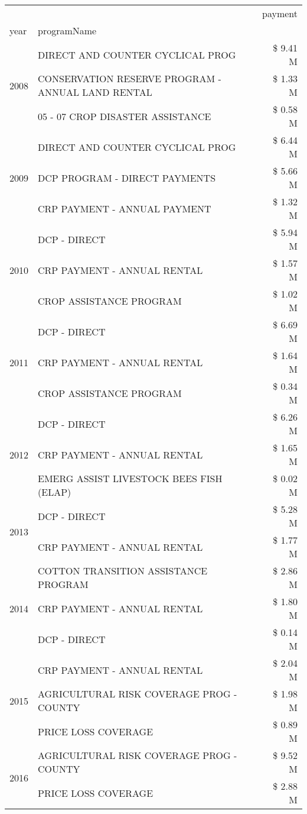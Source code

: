 \begin{tabular}{llr}
\toprule
 &  & payment \\
year & programName &  \\
\midrule
\multirow[t]{3}{*}{2008} & DIRECT AND COUNTER CYCLICAL PROG & \$ 9.41 M \\
 & CONSERVATION RESERVE PROGRAM - ANNUAL LAND RENTAL & \$ 1.33 M \\
 & 05 - 07 CROP DISASTER ASSISTANCE & \$ 0.58 M \\
\cline{1-3}
\multirow[t]{3}{*}{2009} & DIRECT AND COUNTER CYCLICAL PROG & \$ 6.44 M \\
 & DCP PROGRAM - DIRECT PAYMENTS & \$ 5.66 M \\
 & CRP PAYMENT - ANNUAL PAYMENT & \$ 1.32 M \\
\cline{1-3}
\multirow[t]{3}{*}{2010} & DCP - DIRECT & \$ 5.94 M \\
 & CRP PAYMENT - ANNUAL RENTAL & \$ 1.57 M \\
 & CROP ASSISTANCE PROGRAM & \$ 1.02 M \\
\cline{1-3}
\multirow[t]{3}{*}{2011} & DCP - DIRECT & \$ 6.69 M \\
 & CRP PAYMENT - ANNUAL RENTAL & \$ 1.64 M \\
 & CROP ASSISTANCE PROGRAM & \$ 0.34 M \\
\cline{1-3}
\multirow[t]{3}{*}{2012} & DCP - DIRECT & \$ 6.26 M \\
 & CRP PAYMENT - ANNUAL RENTAL & \$ 1.65 M \\
 & EMERG ASSIST LIVESTOCK BEES FISH (ELAP) & \$ 0.02 M \\
\cline{1-3}
\multirow[t]{2}{*}{2013} & DCP - DIRECT & \$ 5.28 M \\
 & CRP PAYMENT - ANNUAL RENTAL & \$ 1.77 M \\
\cline{1-3}
\multirow[t]{3}{*}{2014} & COTTON TRANSITION ASSISTANCE PROGRAM & \$ 2.86 M \\
 & CRP PAYMENT - ANNUAL RENTAL & \$ 1.80 M \\
 & DCP - DIRECT & \$ 0.14 M \\
\cline{1-3}
\multirow[t]{3}{*}{2015} & CRP PAYMENT - ANNUAL RENTAL & \$ 2.04 M \\
 & AGRICULTURAL RISK COVERAGE PROG - COUNTY & \$ 1.98 M \\
 & PRICE LOSS COVERAGE & \$ 0.89 M \\
\cline{1-3}
\multirow[t]{3}{*}{2016} & AGRICULTURAL RISK COVERAGE PROG - COUNTY & \$ 9.52 M \\
 & PRICE LOSS COVERAGE & \$ 2.88 M \\

\end{tabular}
